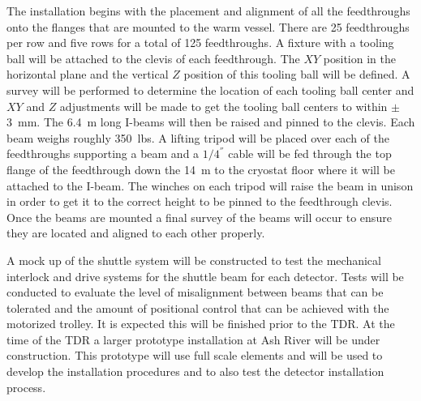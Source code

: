 The  installation begins with the placement and alignment of all
the feedthroughs onto the flanges that are mounted to the warm vessel.
There are \num{25} feedthroughs per row and five rows for a total of \num{125}
feedthroughs.  A fixture with a tooling ball will be attached to the
clevis of each feedthrough.  The $XY$ position in the horizontal plane
and the vertical $Z$ position of this tooling ball will be defined.  A
survey will be performed to determine the location of each tooling
ball center and $XY$ and $Z$ adjustments will be made to get the tooling
ball centers to within $\pm$\SI{3}{mm}.  The \SI{6.4}{m} long I-beams will then be
raised and pinned to the clevis.  Each beam weighs roughly 350~lbs.
A lifting tripod will be placed over each of the feedthroughs
supporting a beam and a $1/4 ^{''}$ cable will be fed through the top
flange of the feedthrough down the \SI{14}{m} to the cryostat floor where it
will be attached to the I-beam.  The winches on each tripod will raise
the beam in unison in order to get it to the correct height to be
pinned to the feedthrough clevis.  Once the beams are mounted a final
survey of the beams will occur to ensure they are located and aligned
to each other properly.

A mock up of the shuttle system will be constructed to test the
mechanical interlock and drive systems for the shuttle beam
for each detector.  Tests will be conducted to evaluate the level of
misalignment between beams that can be tolerated and the amount of
positional control that can be achieved with the motorized trolley. It
is expected this will be finished prior to the TDR. At the time of the
TDR a larger prototype installation at Ash River will be under
construction. This prototype will use full scale elements and will be
used to develop the installation procedures and to also test the
detector installation process.
